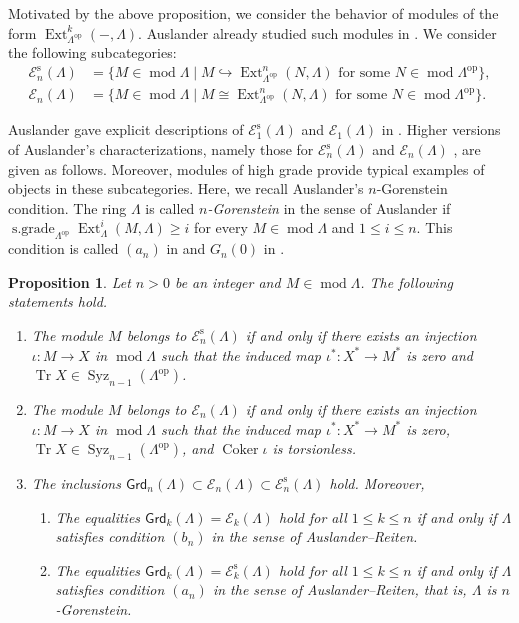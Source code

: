 \documentclass{amsart}
\newtheorem{prop}[thm]{Proposition}
\theoremstyle{definition}
\theoremstyle{remark}
\numberwithin{equation}{thm}
\def\Cok{\operatorname{Coker}}
\def\E{\mathcal{E}}
\def\Ext{\operatorname{Ext}}
\def\ge{\geqslant}
\def\grd{\mathsf{Grd}}
\def\le{\leqslant}
\def\mod{\operatorname{mod}}
\def\sgrade{\operatorname{s\text{.}grade}}
\def\Syz{\operatorname{Syz}}
\def\tr{\operatorname{Tr}}
\begin{document}
Motivated by the above proposition, we consider the behavior of modules of the form $\Ext^k_{\Lambda^{\mathrm{op}}}(-,\Lambda)$.
Auslander already studied such modules in \cite{Aus69}.
We consider the following subcategories:
\begin{align*}
\E_n^{\mathrm{s}}(\Lambda)&=\{M\in\mod\Lambda\mid M\hookrightarrow\Ext^n_{\Lambda^{\mathrm{op}}}(N,\Lambda)\text{ for some }N\in\mod\Lambda^{\mathrm{op}}\},\\
\E_n(\Lambda)&=\{M\in\mod\Lambda\mid M\cong\Ext^n_{\Lambda^{\mathrm{op}}}(N,\Lambda)\text{ for some }N\in\mod\Lambda^{\mathrm{op}}\}.
\end{align*}

Auslander gave explicit descriptions of $\E_1^{\mathrm{s}}(\Lambda)$ and $\E_1(\Lambda)$  in \cite[Proposition 3.2]{Aus69}.
Higher versions of Auslander's characterizations, namely those for $\E_n^{\mathrm{s}}(\Lambda)$ and $\E_n(\Lambda)$ , are given as follows.
Moreover, modules of high grade provide typical examples of objects in these subcategories.
Here, we recall Auslander's $n$-Gorenstein condition.
The ring $\Lambda$ is called {\em $n$-Gorenstein} in the sense of Auslander if $\sgrade_{\Lambda^{\mathrm{op}}}\Ext^i_\Lambda(M,\Lambda)\ge i$ for every $M\in\mod\Lambda$ and $1\le i\le n$.
This condition is called $(a_n)$ in \cite{AR1} and $G_n(0)$ in \cite{HI}.

\begin{prop}\label{Enexpl}
Let $n>0$ be an integer and $M\in\mod\Lambda$. The following statements hold.
\begin{enumerate}[\rm(1)]
   \item The module $M$ belongs to $\E_n^{\mathrm{s}}(\Lambda)$ if and only if there exists an injection $\iota:M\to X$ in $\mod\Lambda$ such that the induced map $\iota^\ast:X^\ast\to M^\ast$ is zero and $\tr X\in\Syz_{n-1}(\Lambda^{\mathrm{op}})$.
   \item The module $M$ belongs to $\E_n(\Lambda)$ if and only if there exists an injection $\iota:M\to X$ in $\mod\Lambda$ such that the induced map $\iota^\ast:X^\ast\to M^\ast$ is zero, $\tr X\in\Syz_{n-1}(\Lambda^{\mathrm{op}})$, and $\Cok\iota$ is torsionless.
   \item The inclusions $\grd_n(\Lambda)\subset\E_n(\Lambda)\subset\E_n^{\mathrm{s}}(\Lambda)$ hold. Moreover,
   \begin{enumerate}[\rm(i)]
      \item The equalities $\grd_k(\Lambda)=\E_k(\Lambda)$ hold for all $1\le k\le n$ if and only if $\Lambda$ satisfies condition $(b_n)$ in the sense of Auslander--Reiten.
      \item The equalities $\grd_k(\Lambda)=\E_k^{\mathrm{s}}(\Lambda)$ hold for all $1\le k\le n$ if and only if $\Lambda$ satisfies condition $(a_n)$ in the sense of Auslander--Reiten, that is, $\Lambda$ is $n$-Gorenstein.
   \end{enumerate}
\end{enumerate}
\end{prop}
\end{document}
